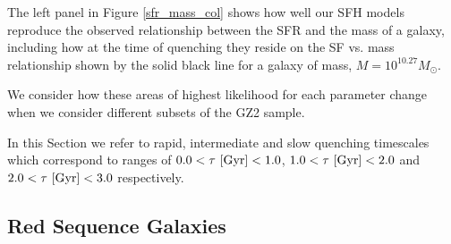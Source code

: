 \documentclass[useAMS,usenatbib]{mn2e}
\begin{document}
The left panel in Figure \ref{sfr_mass_col} shows how well our SFH models reproduce the observed relationship between the SFR and the mass of a galaxy, including how at the time of quenching they reside on the SF vs. mass relationship shown by the solid black line for a galaxy of mass, $M = 10^{10.27} M_{\odot}$.  %


We consider how these areas of highest likelihood for each parameter change when we consider different subsets of the GZ2 sample.

In this Section we refer to rapid, intermediate and slow quenching timescales which correspond to ranges of $0.0 < \tau ~\rm{[Gyr]} < 1.0$, $1.0 < \tau ~\rm{[Gyr]} < 2.0$ and $2.0 < \tau ~\rm{[Gyr]} < 3.0$ respectively. 


\subsection{Red Sequence Galaxies}\label{rs}
\end{document}
